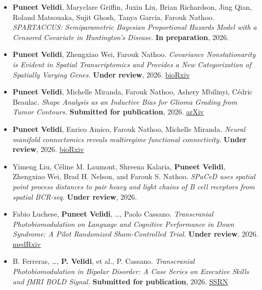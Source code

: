 \documentclass[letterpaper,11pt]{article}
\newenvironment{cvlist}
  {\begin{itemize}[leftmargin=0.15in, label={}, itemsep=2pt, parsep=0pt, topsep=2pt]\small}
  {\end{itemize}}
\newcommand{\status}[1]{\textbf{#1}}
\begin{document}
\begin{cvlist}
\item \textbf{Puneet Velidi}, Maryclare Griffin, Juxin Liu, Brian Richardson, Jing Qian, Roland Matsouaka, Sujit Ghosh, Tanya Garcia, Farouk Nathoo.
\textit{SPARTACCUS: Semiparametric Bayesian Proportional Hazards Model with a Censored Covariate in Huntington's Disease.}
\status{In preparation}, 2026.

\item \textbf{Puneet Velidi}, Zhengxiao Wei, Farouk Nathoo.
\textit{Covariance Nonstationarity is Evident in Spatial Transcriptomics and Provides a New Categorization of Spatially Varying Genes.}
\status{Under review}, 2026. \href{https://www.biorxiv.org/content/10.64898/2026.08.10.743911v1}{\underline{bioRxiv}}

\item \textbf{Puneet Velidi}, Michelle Miranda, Farouk Nathoo, Ashery Mbilinyi, C\'edric Beaulac.
\textit{Shape Analysis as an Inductive Bias for Glioma Grading from Tumor Contours.}
\status{Submitted for publication}, 2026.
\href{https://arxiv.org/abs/2607.26090}{\underline{arXiv}}

\item \textbf{Puneet Velidi}, Enrico Amico, Farouk Nathoo, Michelle Miranda.
\textit{Neural manifold connectomics reveals multiregime functional connectivity.}
\status{Under review}, 2026. \href{https://www.biorxiv.org/content/10.64898/2026.07.24.740595v1}{\underline{bioRxiv}}

\item Yimeng Liu, C\'eline M. Laumont, Shreena Kalaria, \textbf{Puneet Velidi}, Zhengxiao Wei, Brad H. Nelson, and Farouk S. Nathoo.
\textit{SPaCeD uses spatial point process distances to pair heavy and light chains of B cell receptors from spatial BCR-seq.}
\status{Under review}, 2026.

\item Fabio Luchese, \textbf{Puneet Velidi}, \ldots, Paolo Cassano.
\textit{Transcranial Photobiomodulation on Language and Cognitive Performance in Down Syndrome: A Pilot Randomized Sham-Controlled Trial.}
\status{Under review}, 2026.
\href{https://www.medrxiv.org/content/10.64898/2026.07.03.26357051v1}{\underline{medRxiv}}

\item B. Ferreras, \ldots, \textbf{P. Velidi}, et al., P. Cassano.
\textit{Transcranial Photobiomodulation in Bipolar Disorder: A Case Series on Executive Skills and fMRI BOLD Signal.}
\status{Submitted for publication}, 2026. \href{https://papers.ssrn.com/sol3/papers.cfm?abstract_id=7457979}{\underline{SSRN}}


\end{cvlist}
\end{document}

